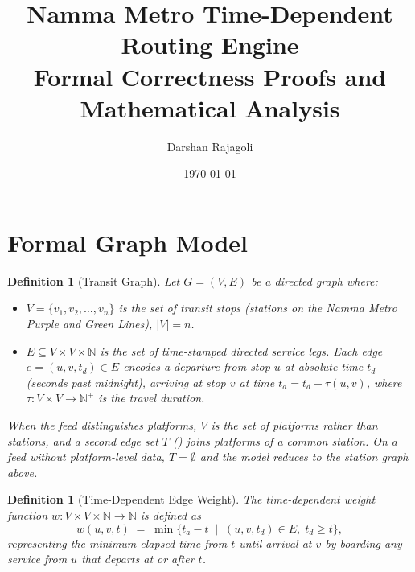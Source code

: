 \documentclass[11pt, a4paper]{article}
\title{%
    \textbf{Namma Metro Time-Dependent Routing Engine}\\[0.5em]
    \large Formal Correctness Proofs and Mathematical Analysis
}
\author{Darshan Rajagoli}
\date{\today}
\newtheorem{definition}[theorem]{Definition}
\theoremstyle{remark}
\newcommand{\N}{\mathbb{N}}
\begin{document}
\maketitle
\tableofcontents
\newpage

\section{Formal Graph Model}

\begin{definition}[Transit Graph]
    Let $G = (V, E)$ be a directed graph where:
    \begin{itemize}
        \item $V = \{v_1, v_2, \ldots, v_n\}$ is the set of transit stops
              (stations on the Namma Metro Purple and Green Lines), $|V| = n$.
        \item $E \subseteq V \times V \times \N$ is the set of time-stamped
              directed service legs. Each edge $e = (u, v, t_d) \in E$ encodes
              a departure from stop $u$ at absolute time $t_d$
              (seconds past midnight), arriving at stop $v$ at time
              $t_a = t_d + \tau(u, v)$, where $\tau: V \times V \to \N^+$
              is the travel duration.
    \end{itemize}

    When the feed distinguishes platforms, $V$ is the set of \emph{platforms}
    rather than stations, and a second edge set $T$ ()
    joins platforms of a common station. On a feed without platform-level
    data, $T = \emptyset$ and the model reduces to the station graph above.
\end{definition}

\begin{definition}[Time-Dependent Edge Weight]
    The time-dependent weight function $w: V \times V \times \N \to \N$ is
    defined as
    \[
        w(u, v, t) \;=\; \min \bigl\{ t_a - t \;\mid\; (u, v, t_d) \in E,\; t_d \ge t \bigr\},
    \]
    representing the minimum elapsed time from $t$ until arrival at $v$ by
    boarding any service from $u$ that departs at or after $t$.
\end{definition}
\end{document}
